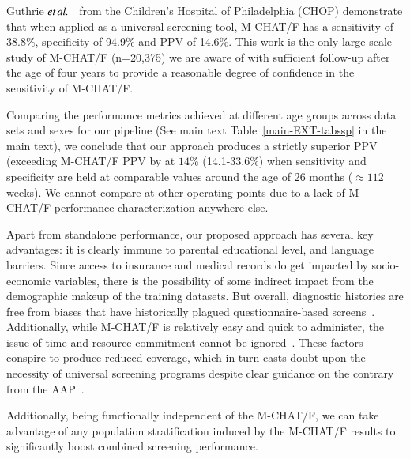\documentclass[3p,super,numbers,sort&compress,preprint,10pt]{elsarticle}
\begin{document}
Guthrie $\textit{et} \mspace{3mu} \textit{al.}$~\cite{pmid31562252} from the Children's Hospital of Philadelphia (CHOP)  demonstrate that when applied as a universal screening tool, M-CHAT/F has a sensitivity of 38.8\%, specificity of 94.9\% and PPV of 14.6\%. This work is the only large-scale study of M-CHAT/F (n=20,375) we are aware of with sufficient follow-up after the age of four years to provide a reasonable degree of confidence in the sensitivity of M-CHAT/F.

Comparing the performance metrics achieved at different age groups across data sets and sexes for our pipeline (See main text  Table~\ref{main-EXT-tabssp} in the main text), we conclude that our approach produces a strictly superior PPV (exceeding M-CHAT/F PPV by at  $14\%$ (14.1-33.6\%) when sensitivity and specificity are held at comparable values around the age of 26 months ($\approx 112$ weeks). We cannot compare at other operating points due to a lack of M-CHAT/F performance characterization anywhere else.

Apart from standalone performance, our proposed approach has several key advantages: it is clearly immune to parental educational level, and language barriers. Since access to insurance and medical records do get impacted by socio-economic variables, there is the possibility of some indirect impact from the demographic makeup of the training datasets. But overall, diagnostic histories are free from biases that have historically plagued questionnaire-based screens~\cite{hyman2020identification}. Additionally, while M-CHAT/F is relatively easy and quick to administer, the issue of time and resource commitment cannot be ignored~\cite{hyman2020identification}. These factors conspire  to produce reduced  coverage, which in turn  casts  doubt upon the necessity of universal screening programs despite clear guidance on the contrary from the AAP~\cite{pmid31562252}. 

Additionally, being functionally independent of the M-CHAT/F, we can take advantage of any population stratification induced by the M-CHAT/F results to significantly boost combined screening performance.
\end{document}
